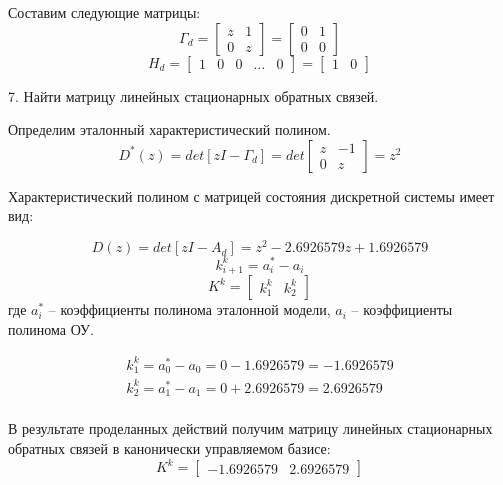\documentclass[a4paper,14pt]{extreport}
\begin{document}
	Составим следующие матрицы:
	\begin{equation}
	\Gamma_d = 
	\begin{bmatrix}
	z & 1\\
	0 & z
	\end{bmatrix}
	=
	\begin{bmatrix}
	0 & 1\\
	0 & 0
	\end{bmatrix}
	\end{equation}
	\begin{equation}
	H_d = 
	\begin{bmatrix}
	1&0&0& \dots &0
	\end{bmatrix}
	=
	\begin{bmatrix}
	1 & 0
	\end{bmatrix}
	\end{equation}
	
	7. Найти матрицу линейных стационарных обратных связей.
	
	Определим эталонный характеристический полином.
	\begin{equation}
	D^*(z) = det[zI - \Gamma_d] = det
	\begin{bmatrix}
	z & -1\\
	0 & z
	\end{bmatrix}
	= z^2
	\end{equation}
	
	Характеристический полином с матрицей состояния дискретной системы имеет вид:
	
	\begin{equation}
	D(z) = det[zI - A_d] = z^2 - 2.6926579z + 1.6926579  
	\end{equation}
	\begin{equation}
	k_{i+1}^k = a_i^* - a_i
	\end{equation}
	\begin{equation}
	K^k = 
	\begin{bmatrix}
	k_1^k & k_2^k
	\end{bmatrix}
	\end{equation}
	где $a_i^*$ -- коэффициенты полинома эталонной модели, $a_i$ -- коэффициенты полинома ОУ.
	
	\begin{align}
	k_1^k = a_0^* - a_0 = 0 - 1.6926579 = - 1.6926579\\
	k_2^k = a_1^* - a_1 = 0 + 2.6926579  = 2.6926579\\
	\end{align}
	
	В результате проделанных действий получим матрицу линейных стационарных обратных связей в канонически управляемом базисе:
	\begin{equation}
	K^k = 
	\begin{bmatrix}
	- 1.6926579 & 2.6926579
	\end{bmatrix}
	\end{equation}
	
\end{document}
